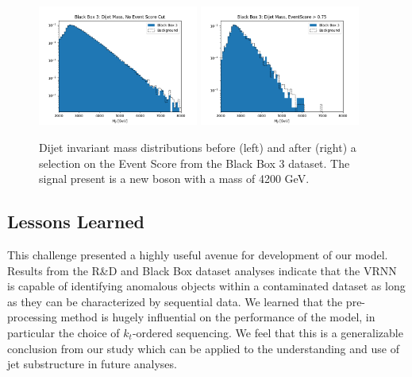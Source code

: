 \documentclass[letterpaper,11pt]{article}
\begin{document}
\begin{figure}[H]
	\begin{center}
		\includegraphics[width=0.47\textwidth]{imgs/BB3.png}
		\includegraphics[width=0.47\textwidth]{imgs/BB3_Cut.png}
	\end{center}
	\caption{Dijet invariant mass distributions before (left) and after (right) a selection on the Event Score from the Black Box 3 dataset. The signal present is a new boson with a mass of 4200 GeV.}
	\label{fig:bb3}
\end{figure}


\subsection{Lessons Learned}
\label{sec:lessons}


This challenge presented a highly useful avenue for development of our model. 
Results from the R\&D and Black Box dataset analyses indicate that the VRNN is capable of identifying anomalous objects within a contaminated dataset as long as they can be characterized by sequential data. 
We learned that the pre-processing method is hugely influential on the performance of the model, in particular the choice of $k_{t}$-ordered sequencing. 
We feel that this is a generalizable conclusion from our study which can be applied to the understanding and use of jet substructure in future analyses.
\end{document}
